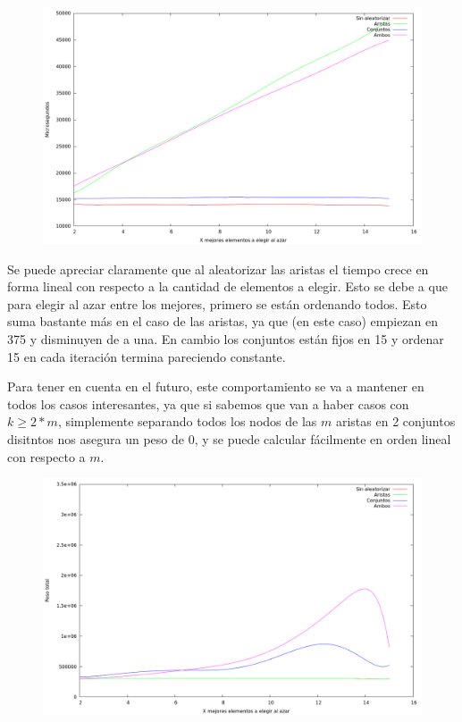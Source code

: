 \begin{figure}[H]
  \begin{center}
    \includegraphics[scale=0.35]{imagenes/grasp-goloso-x-tiempo.png}
  \end{center}
\end{figure}

\vspace*{0.5cm}

Se puede apreciar claramente que al aleatorizar las aristas el tiempo crece
en forma lineal con respecto a la cantidad de elementos a elegir. Esto se debe
a que para elegir al azar entre los mejores, primero se están ordenando todos.
Esto suma bastante más en el caso de las aristas, ya que (en este caso)
empiezan en 375 y disminuyen de a una. En cambio los conjuntos están fijos en
15 y ordenar 15 en cada iteración termina pareciendo constante.

Para tener en cuenta en el futuro, este comportamiento se va a mantener en
todos los casos interesantes, ya que si sabemos que van a haber casos con
$k \geq 2*m$, simplemente separando todos los nodos de las $m$ aristas en 2
conjuntos disitntos nos asegura un peso de 0, y se puede calcular fácilmente
en orden lineal con respecto a $m$.

\vspace*{0.5cm}

\begin{figure}[H]
  \begin{center}
    \includegraphics[scale=0.35]{imagenes/grasp-goloso-x-peso.png}
  \end{center}
\end{figure}

